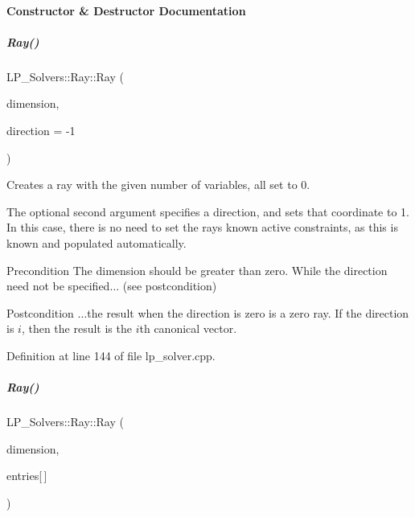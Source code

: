 \paragraph{Constructor \& Destructor Documentation}
\mbox{\label{group___c_l_s_solvers_ae6acfc48cec4f68f5855aae467f71095}} 
\subparagraph{\texorpdfstring{Ray()}{Ray()}\hspace{0.1cm}{\footnotesize\ttfamily [1/5]}}
{\footnotesize\ttfamily L\+P\+\_\+\+Solvers\+::\+Ray\+::\+Ray (\begin{DoxyParamCaption}\item[{N\+V\+A\+R\+\_\+\+T\+Y\+PE}]{dimension,  }\item[{long}]{direction = {\ttfamily -\/1} }\end{DoxyParamCaption})}



Creates a ray with the given number of variables, all set to 0. 

The optional second argument specifies a direction, and sets that coordinate to 1. In this case, there is no need to set the ray\textquotesingle{}s known active constraints, as this is known and populated automatically. \begin{DoxyPrecond}{Precondition}
The dimension should be greater than zero. While the direction need not be specified{$\dots$} (see postcondition) 
\end{DoxyPrecond}
\begin{DoxyPostcond}{Postcondition}
{$\dots$}the result when the direction is zero is a zero ray. If the direction is $ i $, then the result is the $i$th canonical vector. 
\end{DoxyPostcond}


Definition at line 144 of file lp\+\_\+solver.\+cpp.

\mbox{\label{group___c_l_s_solvers_ad69015f04db3f988b47cd05bae4f41a8}} 
\subparagraph{\texorpdfstring{Ray()}{Ray()}\hspace{0.1cm}{\footnotesize\ttfamily [2/5]}}
{\footnotesize\ttfamily L\+P\+\_\+\+Solvers\+::\+Ray\+::\+Ray (\begin{DoxyParamCaption}\item[{N\+V\+A\+R\+\_\+\+T\+Y\+PE}]{dimension,  }\item[{const R\+A\+Y\+E\+N\+T\+\_\+\+T\+Y\+PE}]{entries\mbox{[}$\,$\mbox{]} }\end{DoxyParamCaption})}



